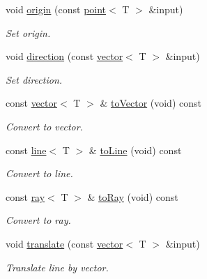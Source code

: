\begin{DoxyCompactItemize}
void \hyperlink{classddd_1_1infinite_object_a82ecd5fc09ecfe5b1fe9a2609dd1465e}{origin} (const \hyperlink{classddd_1_1point}{point}$<$ T $>$ \&input)
\begin{DoxyCompactList}\small\item\em Set origin. \end{DoxyCompactList}\item 
void \hyperlink{classddd_1_1infinite_object_a1940ac3d87fc2ca742ca036c866736e8}{direction} (const \hyperlink{classddd_1_1vector}{vector}$<$ T $>$ \&input)
\begin{DoxyCompactList}\small\item\em Set direction. \end{DoxyCompactList}\item 
\mbox{\label{classddd_1_1infinite_object_a7f5790458f0f4e5bb085b580ead9e862}} 
const \hyperlink{classddd_1_1vector}{vector}$<$ T $>$ \& \hyperlink{classddd_1_1infinite_object_a7f5790458f0f4e5bb085b580ead9e862}{to\+Vector} (void) const
\begin{DoxyCompactList}\small\item\em Convert to vector. \end{DoxyCompactList}\item 
\mbox{\label{classddd_1_1infinite_object_ab51b563ee31f9b473cc2459f6fd6caae}} 
const \hyperlink{classddd_1_1line}{line}$<$ T $>$ \& \hyperlink{classddd_1_1infinite_object_ab51b563ee31f9b473cc2459f6fd6caae}{to\+Line} (void) const
\begin{DoxyCompactList}\small\item\em Convert to line. \end{DoxyCompactList}\item 
\mbox{\label{classddd_1_1infinite_object_ac34ea2bfd432c3a07c03b508c3e1e499}} 
const \hyperlink{classddd_1_1ray}{ray}$<$ T $>$ \& \hyperlink{classddd_1_1infinite_object_ac34ea2bfd432c3a07c03b508c3e1e499}{to\+Ray} (void) const
\begin{DoxyCompactList}\small\item\em Convert to ray. \end{DoxyCompactList}\item 
void \hyperlink{classddd_1_1infinite_object_a72649daa44060efdbef986ab9d90f3f6}{translate} (const \hyperlink{classddd_1_1vector}{vector}$<$ T $>$ \&input)
\begin{DoxyCompactList}\small\item\em Translate line by vector. \end{DoxyCompactList}\item 

\end{DoxyCompactItemize}
